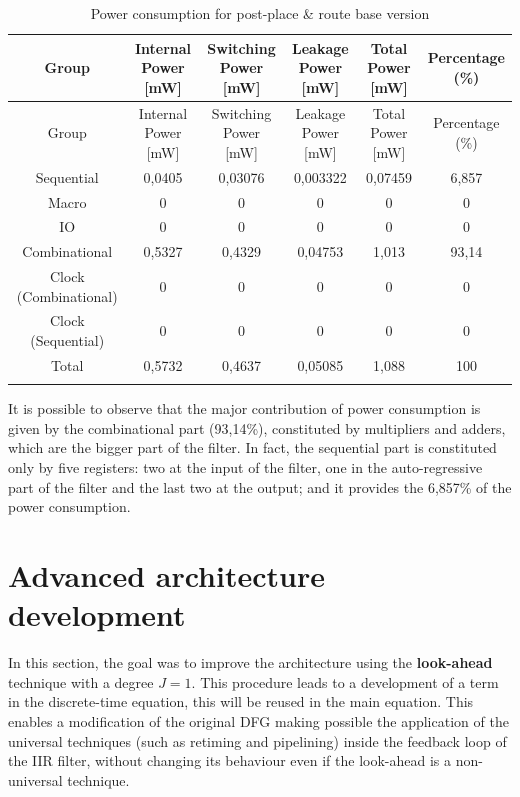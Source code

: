 \documentclass[a4paper, titlepage]{article}
\begin{document}
\begin{longtable}{*6c}
\caption{Power consumption for post-place \& route base version}
\label{tab:tot power}\\
\toprule
Group & \thead{Internal\\Power [mW]} & \thead{Switching\\Power [mW]} & \thead{Leakage\\Power [mW]} & \thead{Total\\Power  [mW]}& \thead{Percentage\\(\%)}\\
\midrule
\endfirsthead
Group & \thead{Internal\\Power [mW]} & \thead{Switching\\Power [mW]} & \thead{Leakage\\Power [mW]} & \thead{Total\\Power  [mW]}& \thead{Percentage\\(\%)}\\
\midrule
\endhead
\midrule
\endfoot
Sequential & 0,0405 & 0,03076 & 0,003322 & 0,07459 & 6,857 \\
Macro & 0 & 0 & 0 & 0 & 0\\
IO & 0 & 0 & 0 & 0 & 0\\
Combinational & 0,5327 & 0,4329 & 0,04753 & 1,013 & 93,14\\
Clock (Combinational) & 0 & 0 & 0 & 0 & 0\\
Clock (Sequential) & 0 & 0 & 0 & 0 & 0\\
\bottomrule
Total & 0,5732 & 0,4637 & 0,05085 & 1,088 & 100\\
\endlastfoot
\end{longtable}
\noindent
It is possible to observe that the major contribution of power consumption is given by the combinational part (93,14\%), constituted by multipliers and adders, which are the bigger part of the filter. In fact, the sequential part is constituted only by five registers: two at the input of the filter, one in the auto-regressive part of the filter and the last two at the output; and it provides the 6,857\% of the power consumption.

\newpage
\section{Advanced architecture development}
In this section, the goal was to improve the architecture using the \textbf{look-ahead} technique with a degree $J=1$. This procedure leads to a development of  a term in the discrete-time equation, this will be reused in the main equation. This enables a modification of the original DFG making possible the application of the universal techniques (such as retiming and pipelining) inside the feedback loop of the IIR filter, without changing its behaviour even if the look-ahead is a non-universal technique. 
\end{document}
